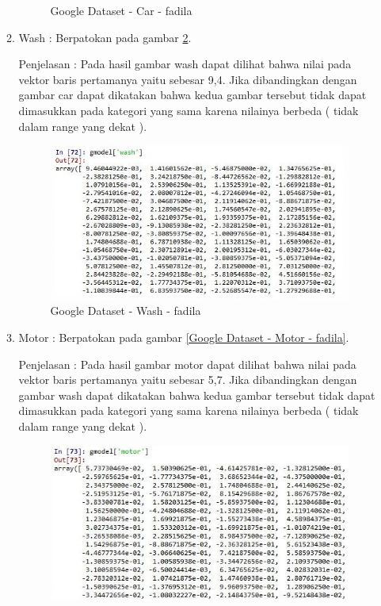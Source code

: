 \begin{enumerate}
\begin{enumerate}
\begin{figure}[!hbtp]
\caption{Google Dataset - Car - fadila}
\label{Google Dataset - Car - fadila}
\end{figure}
\par
\item Wash :  Berpatokan pada gambar \ref{Google Dataset - Wash - fadila}.
\par Penjelasan : Pada hasil gambar wash dapat dilihat bahwa nilai pada vektor baris pertamanya yaitu sebesar 9,4. Jika dibandingkan dengan gambar car dapat dikatakan bahwa kedua gambar tersebut tidak dapat dimasukkan pada kategori yang sama karena nilainya berbeda ( tidak dalam range yang dekat ).
\par
\begin{figure}[!hbtp]
\centering
\includegraphics[scale=0.3]{figures/1-wash-fadila.jpg}
\caption{Google Dataset - Wash - fadila}
\label{Google Dataset - Wash - fadila}
\end{figure}
\par
\item Motor :  Berpatokan pada gambar \ref{Google Dataset - Motor - fadila}.
\par Penjelasan : Pada hasil gambar motor dapat dilihat bahwa nilai pada vektor baris pertamanya yaitu sebesar 5,7. Jika dibandingkan dengan gambar wash dapat dikatakan bahwa kedua gambar tersebut tidak dapat dimasukkan pada kategori yang sama karena nilainya berbeda ( tidak dalam range yang dekat ).
\par
\begin{figure}[!hbtp]
\centering
\includegraphics[scale=0.3]{figures/1-motor-fadila.jpg}

\end{figure}
\end{enumerate}
\end{enumerate}
